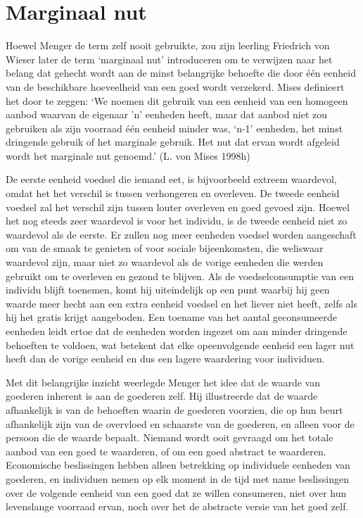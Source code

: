 \documentclass[
  a5paper,
  smalldemyvopaper,11pt,twoside,onecolumn,openright,extrafontsizes,
hidelinks]{memoir}
\begin{document}
\section{Marginaal nut}\label{marginaal-nut}

Hoewel Menger de term zelf nooit gebruikte, zou zijn leerling Friedrich
von Wieser later de term `marginaal nut' introduceren om te verwijzen
naar het belang dat gehecht wordt aan de minst belangrijke behoefte die
door één eenheid van de beschikbare hoeveelheid van een goed wordt
verzekerd. Mises definieert het door te zeggen: `We noemen dit gebruik
van een eenheid van een homogeen aanbod waarvan de eigenaar 'n' eenheden
heeft, maar dat aanbod niet zou gebruiken als zijn voorraad één eenheid
minder was, `n-1' eenheden, het minst dringende gebruik of het marginale
gebruik. Het nut dat ervan wordt afgeleid wordt het marginale nut
genoemd.' (L. von Mises 1998h)

De eerste eenheid voedsel die iemand eet, is bijvoorbeeld extreem
waardevol, omdat het het verschil is tussen verhongeren en overleven. De
tweede eenheid voedsel zal het verschil zijn tussen louter overleven en
goed gevoed zijn. Hoewel het nog steeds zeer waardevol is voor het
individu, is de tweede eenheid niet zo waardevol als de eerste. Er
zullen nog meer eenheden voedsel worden aangeschaft om van de smaak te
genieten of voor sociale bijeenkomsten, die weliswaar waardevol zijn,
maar niet zo waardevol als de vorige eenheden die werden gebruikt om te
overleven en gezond te blijven. Als de voedselconsumptie van een
individu blijft toenemen, komt hij uiteindelijk op een punt waarbij hij
geen waarde meer hecht aan een extra eenheid voedsel en het liever niet
heeft, zelfs als hij het gratis krijgt aangeboden. Een toename van het
aantal geconsumeerde eenheden leidt ertoe dat de eenheden worden ingezet
om aan minder dringende behoeften te voldoen, wat betekent dat elke
opeenvolgende eenheid een lager nut heeft dan de vorige eenheid en dus
een lagere waardering voor individuen.

Met dit belangrijke inzicht weerlegde Menger het idee dat de waarde van
goederen inherent is aan de goederen zelf. Hij illustreerde dat de
waarde afhankelijk is van de behoeften waarin de goederen voorzien, die
op hun beurt afhankelijk zijn van de overvloed en schaarste van de
goederen, en alleen voor de persoon die de waarde bepaalt. Niemand wordt
ooit gevraagd om het totale aanbod van een goed te waarderen, of om een
goed abstract te waarderen. Economische beslissingen hebben alleen
betrekking op individuele eenheden van goederen, en individuen nemen op
elk moment in de tijd met name beslissingen over de volgende eenheid van
een goed dat ze willen consumeren, niet over hun levenslange voorraad
ervan, noch over het de abstracte versie van het goed zelf.
\end{document}
